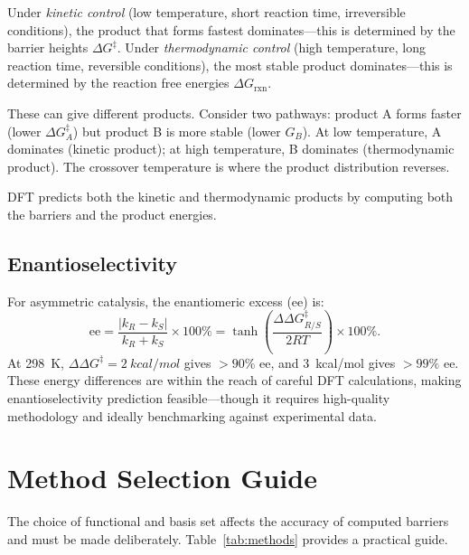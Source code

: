 \documentclass[11pt]{article}
\numberwithin{equation}{section}
\begin{document}
Under \emph{kinetic control} (low temperature, short reaction time, irreversible conditions), the product that forms fastest dominates---this is determined by the barrier heights $\Delta G^\ddagger$. Under \emph{thermodynamic control} (high temperature, long reaction time, reversible conditions), the most stable product dominates---this is determined by the reaction free energies $\Delta G_\text{rxn}$.

These can give different products. Consider two pathways: product A forms faster (lower $\Delta G^\ddagger_A$) but product B is more stable (lower $G_B$). At low temperature, A dominates (kinetic product); at high temperature, B dominates (thermodynamic product). The crossover temperature is where the product distribution reverses.

DFT predicts both the kinetic and thermodynamic products by computing both the barriers and the product energies.

\subsection{Enantioselectivity}

For asymmetric catalysis, the enantiomeric excess (ee) is:
\begin{equation}
\text{ee} = \frac{|k_R - k_S|}{k_R + k_S}\times 100\% = \tanh\!\left(\frac{\Delta\Delta G^\ddagger_{R/S}}{2RT}\right)\times 100\%.
\end{equation}
At \SI{298}{K}, $\Delta\Delta G^\ddagger = \SI{2}{kcal/mol}$ gives ${>}90\%$ ee, and \SI{3}{kcal/mol} gives ${>}99\%$ ee. These energy differences are within the reach of careful DFT calculations, making enantioselectivity prediction feasible---though it requires high-quality methodology and ideally benchmarking against experimental data.


\section{Method Selection Guide}
\label{sec:methods}

The choice of functional and basis set affects the accuracy of computed barriers and must be made deliberately. Table~\ref{tab:methods} provides a practical guide.
\end{document}
